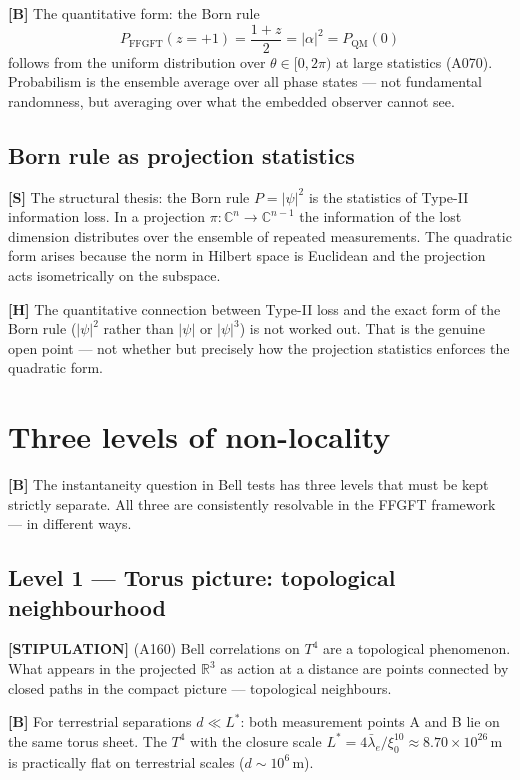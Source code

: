 \textbf{[B]} The quantitative form: the Born rule
\[
  P_\text{FFGFT}(z=+1) = \frac{1+z}{2} = |\alpha|^2 = P_\text{QM}(0)
\]
follows from the uniform distribution over $\theta \in [0,2\pi)$ at large
statistics (A070). Probabilism is the ensemble average over all phase
states --- not fundamental randomness, but averaging over what the
embedded observer cannot see.

\subsection{Born rule as projection statistics}

\textbf{[S]} The structural thesis: the Born rule $P = |\psi|^2$ is
the statistics of Type-II information loss. In a projection
$\pi: \mathbb{C}^n \to \mathbb{C}^{n-1}$ the information of the lost
dimension distributes over the ensemble of repeated measurements. The
quadratic form arises because the norm in Hilbert space is Euclidean
and the projection acts isometrically on the subspace.

\textbf{[H]} The quantitative connection between Type-II loss and the
exact form of the Born rule ($|\psi|^2$ rather than $|\psi|$ or
$|\psi|^3$) is not worked out. That is the genuine open point --- not
whether but precisely how the projection statistics enforces the
quadratic form.

\section{Three levels of non-locality}

\textbf{[B]} The instantaneity question in Bell tests has three levels
that must be kept strictly separate. All three are consistently
resolvable in the FFGFT framework --- in different ways.

\subsection{Level 1 --- Torus picture: topological neighbourhood}

\textbf{[STIPULATION]} (A160) Bell correlations on $T^4$ are a
topological phenomenon. What appears in the projected $\mathbb{R}^3$
as action at a distance are points connected by closed paths in the
compact picture --- topological neighbours.

\textbf{[B]} For terrestrial separations $d \ll L^*$: both measurement
points A and B lie on the same torus sheet. The $T^4$ with the
closure scale $L^* = 4\bar\lambda_e/\xi_0^{10} \approx 8{.}70 \times
10^{26}$\,m is practically flat on terrestrial scales ($d \sim 10^6$\,m).

